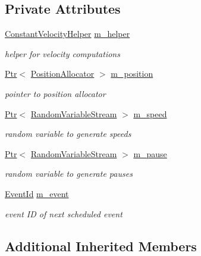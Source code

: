 \subsection*{Private Attributes}
\begin{DoxyCompactItemize}
\item 
\hyperlink{classns3_1_1ConstantVelocityHelper}{Constant\+Velocity\+Helper} \hyperlink{classns3_1_1RandomWaypointMobilityModel_a2e9ce665622899c64f915b4c1af74189}{m\+\_\+helper}
\begin{DoxyCompactList}\small\item\em helper for velocity computations \end{DoxyCompactList}\item 
\hyperlink{classns3_1_1Ptr}{Ptr}$<$ \hyperlink{classns3_1_1PositionAllocator}{Position\+Allocator} $>$ \hyperlink{classns3_1_1RandomWaypointMobilityModel_a5403d3195d0dd7afee4de130d9dc8a14}{m\+\_\+position}
\begin{DoxyCompactList}\small\item\em pointer to position allocator \end{DoxyCompactList}\item 
\hyperlink{classns3_1_1Ptr}{Ptr}$<$ \hyperlink{classns3_1_1RandomVariableStream}{Random\+Variable\+Stream} $>$ \hyperlink{classns3_1_1RandomWaypointMobilityModel_a573f6a14ec00b07199fa6445f006f4ba}{m\+\_\+speed}
\begin{DoxyCompactList}\small\item\em random variable to generate speeds \end{DoxyCompactList}\item 
\hyperlink{classns3_1_1Ptr}{Ptr}$<$ \hyperlink{classns3_1_1RandomVariableStream}{Random\+Variable\+Stream} $>$ \hyperlink{classns3_1_1RandomWaypointMobilityModel_a96ecd2f32821fa7ce41897191a8aab8d}{m\+\_\+pause}
\begin{DoxyCompactList}\small\item\em random variable to generate pauses \end{DoxyCompactList}\item 
\hyperlink{classns3_1_1EventId}{Event\+Id} \hyperlink{classns3_1_1RandomWaypointMobilityModel_a972b615df5f597fa3c8c6408a0d15907}{m\+\_\+event}
\begin{DoxyCompactList}\small\item\em event ID of next scheduled event \end{DoxyCompactList}\end{DoxyCompactItemize}
\subsection*{Additional Inherited Members}


